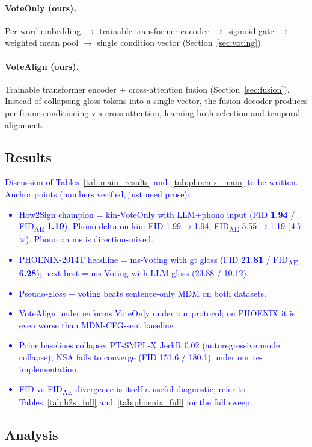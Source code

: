 \documentclass{article}
\newcommand{\placeholder}[1]{\textcolor{blue}{#1}}
\begin{document}
\paragraph{VoteOnly (ours).}
Per-word embedding $\to$ trainable transformer encoder $\to$ sigmoid gate $\to$ weighted mean pool $\to$ single condition vector (Section~\ref{sec:voting}).

\paragraph{VoteAlign (ours).}
Trainable transformer encoder + cross-attention fusion (Section~\ref{sec:fusion}).
Instead of collapsing gloss tokens into a single vector, the fusion decoder produces per-frame conditioning via cross-attention, learning both selection and temporal alignment.

\subsection{Results}
\label{sec:results}

\placeholder{
Discussion of Tables~\ref{tab:main_results} and~\ref{tab:phoenix_main} to be written. Anchor points (numbers verified, just need prose):
\begin{itemize}
  \item How2Sign champion = kin-VoteOnly with LLM+phono input (FID \textbf{1.94} / FID\textsubscript{AE} \textbf{1.19}). Phono delta on kin: FID 1.99$\to$1.94, FID\textsubscript{AE} 5.55$\to$1.19 (4.7$\times$). Phono on ms is direction-mixed.
  \item PHOENIX-2014T headline = ms-Voting with gt gloss (FID \textbf{21.81} / FID\textsubscript{AE} \textbf{6.28}); next best = ms-Voting with LLM gloss (23.88 / 10.12).
  \item Pseudo-gloss + voting beats sentence-only MDM on both datasets.
  \item VoteAlign underperforms VoteOnly under our protocol; on PHOENIX it is even worse than MDM-CFG-sent baseline.
  \item Prior baselines collapse: PT-SMPL-X JerkR 0.02 (autoregressive mode collapse); NSA fails to converge (FID 151.6 / 180.1) under our re-implementation.
  \item FID vs FID\textsubscript{AE} divergence is itself a useful diagnostic; refer to Tables~\ref{tab:h2s_full} and~\ref{tab:phoenix_full} for the full sweep.
\end{itemize}
}

\subsection{Analysis}
\label{sec:analysis}
\end{document}
